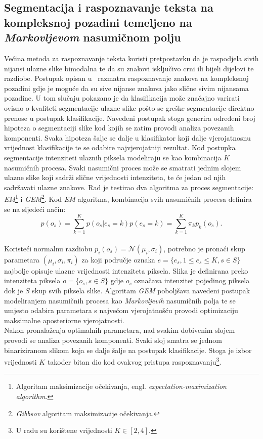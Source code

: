 \subsection{Segmentacija i raspoznavanje teksta na kompleksnoj pozadini temeljeno na \emph{Markovljevom} nasumičnom
polju}
\label{subsec:segmentacija-i-raspoznavanje-teksta-na-kompleksnoj-pozadini-temeljeno-na-markovljevom-nasumicnom-polju}
Većina metoda za raspoznavanje teksta koristi pretpostavku da je raspodjela sivih nijansi ulazne slike bimodalna te da
su znakovi isključivo crni ili bijeli dijelovi te razdiobe. Postupak opisan u\ \citep{chen2002} razmatra raspoznavanje
znakova na kompleksnoj pozadini gdje je moguće da su sive nijanse znakova jako slične sivim nijansama pozadine. U tom
slučaju pokazano je da klasifikacija može značajno varirati ovisno o kvaliteti segmentacije ulazne slike pošto se greške
segmentacije direktno prenose u postupak klasifikacije. Navedeni postupak stoga generira određeni broj hipoteza o
segmentaciji slike kod kojih se zatim provodi analiza povezanih komponenti. Svaka hipoteza šalje se dalje u klasifikator
koji dalje vjerojatnosnu vrijednost klasifikacije te se odabire najvjerojatniji rezultat. Kod postupka segmentacije
intenziteti ulaznih piksela modeliraju se kao kombinacija $K$ nasumičnih procesa. Svaki nasumični proces može se
smatrati jednim slojem ulazne slike koji sadrži slične vrijednosti intenziteta, te će jedan od njih sadržavati ulazne
znakove. Rad je testirao dva algoritma za proces segmentacije: \emph{EM}\footnote{Algoritam maksimizacije očekivanja,
engl. \emph{expectation-maximization algorithm}.} i \emph{GEM}\footnote{\emph{Gibbsov} algoritam maksimizacije
očekivanja.}. Kod \emph{EM} algoritma, kombinacija svih nasumičnih procesa definira se na sljedeći način:\\
\begin{equation}
    p(o_s) = \sum_{k = 1}^{K} p(o_s | e_s = k) p(e_s = k) = \sum_{k = 1}^{K} \pi_k p_k(o_s).\label{eq:markov-prob}
\end{equation}
\\
Koristeći normalnu razdiobu $p_i(o_s) = \mathcal{N}(\mu_i, \sigma_i)$, potrebno je pronaći skup parametara
$(\mu_i, \sigma_i, \pi_i)$ za koji područje oznaka $e = \{e_s, 1 \leq e_s \leq K, s \in S\}$ najbolje opisuje ulazne
vrijednosti intenziteta piksela. Slika je definirana preko intenziteta piksela $o = \{o_s, s \in S\}$ gdje $o_s$
označava intenzitet pojedinog piksela dok je $S$ skup svih piksela slike. Algoritam \emph{GEM} poboljšava navedeni
postupak modeliranjem nasumičnih procesa kao \emph{Markovljevih} nasumičnih polja te se umjesto odabira parametara s
najvećom vjerojatnošću provodi optimizaciju maksimalne aposteriorne vjerojatnosti.\\
Nakon pronalaženja optimalnih parametara, nad svakim dobivenim slojem provodi se analiza povezanih komponenti. Svaki
sloj smatra se jednom binariziranom slikom koja se dalje šalje na postupak klasifikacije. Stoga je izbor vrijednosti
$K$ također bitan dio kod ovakvog pristupa raspoznavanju\footnote{U radu su korištene vrijednosti $K \in [2, 4]$.}.
